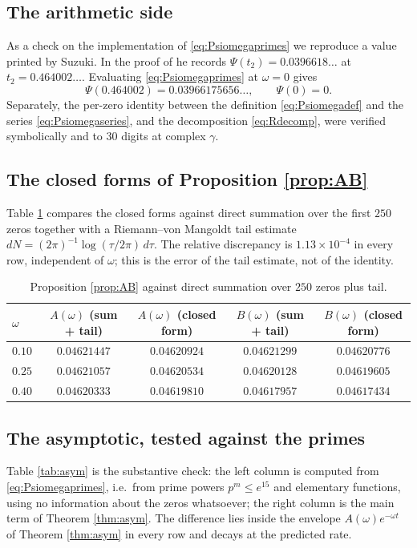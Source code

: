 \documentclass[11pt,reqno]{amsart}
\theoremstyle{plain}
\theoremstyle{definition}
\begin{document}
\subsection{The arithmetic side}
As a check on the implementation of \eqref{eq:Psiomegaprimes} we reproduce a value printed by
Suzuki. In the proof of \cite[Thm.~4.1]{Suzuki2023} he records $\Psi(t_2)=0.0396618\ldots$ at
$t_2=0.464002\ldots$. Evaluating \eqref{eq:Psiomegaprimes} at $\omega=0$ gives
\[
  \Psi(0.464002)=0.03966175656\ldots,\qquad \Psi(0)=0 .
\]
Separately, the per-zero identity between the definition \eqref{eq:Psiomegadef} and the series
\eqref{eq:Psiomegaseries}, and the decomposition \eqref{eq:Rdecomp}, were verified symbolically and
to $30$ digits at complex $\gamma$.

\subsection{The closed forms of Proposition \ref{prop:AB}}
Table \ref{tab:AB} compares the closed forms against direct summation over the first $250$ zeros
together with a Riemann--von Mangoldt tail estimate $dN=(2\pi)^{-1}\log(\tau/2\pi)\,d\tau$. The
relative discrepancy is $1.13\times10^{-4}$ in every row, independent of $\omega$; this is the error
of the tail estimate, not of the identity.

\begin{table}[htbp]
\centering
\begin{tabular}{@{}lcccc@{}}
\toprule
$\omega$ & $A(\omega)$ (sum + tail) & $A(\omega)$ (closed form) & $B(\omega)$ (sum + tail) & $B(\omega)$ (closed form)\\
\midrule
$0.10$ & $0.04621447$ & $0.04620924$ & $0.04621299$ & $0.04620776$\\
$0.25$ & $0.04621057$ & $0.04620534$ & $0.04620128$ & $0.04619605$\\
$0.40$ & $0.04620333$ & $0.04619810$ & $0.04617957$ & $0.04617434$\\
\bottomrule
\end{tabular}
\vspace{2mm}
\caption{Proposition \ref{prop:AB} against direct summation over $250$ zeros plus tail.}
\label{tab:AB}
\end{table}

\subsection{The asymptotic, tested against the primes}
Table \ref{tab:asym} is the substantive check: the left column is computed from
\eqref{eq:Psiomegaprimes}, i.e.\ from prime powers $p^m\le e^{15}$ and elementary functions, using
no information about the zeros whatsoever; the right column is the main term of Theorem
\ref{thm:asym}. The difference lies inside the envelope $A(\omega)e^{-\omega t}$ of Theorem
\ref{thm:asym} in every row and decays at the predicted rate.
\end{document}
